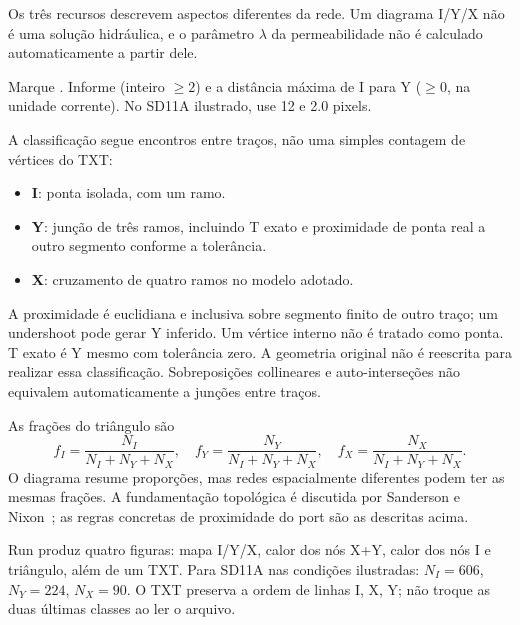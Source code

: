 \label{sec:flow}
Os três recursos descrevem aspectos diferentes da rede. Um diagrama I/Y/X não é uma solução hidráulica, e o parâmetro \(\lambda\) da permeabilidade não é calculado automaticamente a partir dele.

Marque . Informe  (inteiro \(\geq2\)) e a distância máxima de I para Y (\(\geq0\), na unidade corrente). No SD11A ilustrado, use 12 e 2.0 pixels.

A classificação segue encontros entre traços, não uma simples contagem de vértices do TXT:
\begin{itemize}
\item \textbf{I}: ponta isolada, com um ramo.
\item \textbf{Y}: junção de três ramos, incluindo T exato e proximidade de ponta real a outro segmento conforme a tolerância.
\item \textbf{X}: cruzamento de quatro ramos no modelo adotado.
\end{itemize}
A proximidade é euclidiana e inclusiva sobre segmento finito de outro traço; um undershoot pode gerar Y inferido. Um vértice interno não é tratado como ponta. T exato é Y mesmo com tolerância zero. A geometria original não é reescrita para realizar essa classificação. Sobreposições collineares e auto-interseções não equivalem automaticamente a junções entre traços.

As frações do triângulo são
\begin{equation}f_I=\frac{N_I}{N_I+N_Y+N_X},\quad f_Y=\frac{N_Y}{N_I+N_Y+N_X},\quad f_X=\frac{N_X}{N_I+N_Y+N_X}.
\end{equation}
O diagrama resume proporções, mas redes espacialmente diferentes podem ter as mesmas frações. A fundamentação topológica é discutida por Sanderson e Nixon~\cite{sanderson}; as regras concretas de proximidade do port são as descritas acima.

Run produz quatro figuras: mapa I/Y/X, calor dos nós X+Y, calor dos nós I e triângulo, além de um TXT. Para SD11A nas condições ilustradas: \(N_I=606\), \(N_Y=224\), \(N_X=90\). O TXT preserva a ordem de linhas I, X, Y; não troque as duas últimas classes ao ler o arquivo.

